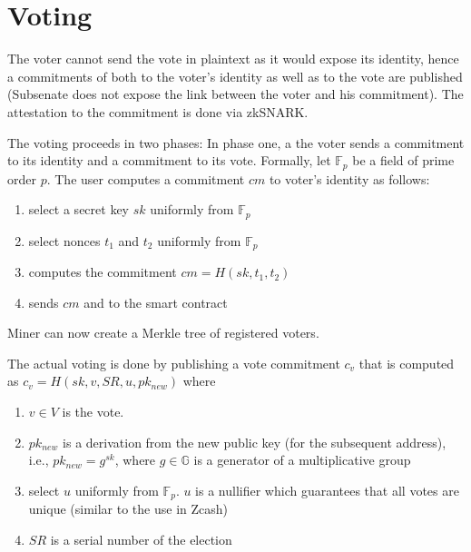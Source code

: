 \documentclass[]{paper}
\begin{document}
	
		
\section{Voting}
The voter cannot send the vote in plaintext as it would expose its identity, hence a commitments of both to the voter's identity as well as to the vote are published (Subsenate does not expose the link between the voter and his commitment). The attestation to the commitment is done via zkSNARK.   

The voting proceeds in two phases: In phase one, a the voter sends a commitment to its identity and a commitment to its vote.  Formally, let $\mathbb{F}_p$ be a field of prime order $p$. The user computes a commitment $cm$ to voter's identity as follows:

\begin{enumerate}
	\item select a secret key $sk$ uniformly from $\mathbb{F}_p$
	\item select nonces $t_1$ and $t_2$ uniformly from $\mathbb{F}_p$
	\item computes the commitment $cm = H(sk,t_1,t_2)$
	\item sends $cm$ and to the smart contract
\end{enumerate}
Miner can now create a Merkle tree of registered voters.

The actual voting is done by publishing a vote commitment $c_v$ that is computed as  $c_v= H(sk,v,SR,u,pk_{new})$ where
\begin{enumerate}
	\item $v\in V$ is the vote. 
	\item $pk_{new}$ is a derivation from the new public key (for the subsequent address), i.e., $pk_{new} = g^{sk}$, where $g\in \mathbb{G}$ is a generator of a multiplicative group
	\item select $u$ uniformly from  $\mathbb{F}_p$. $u$ is a nullifier which guarantees that all votes are unique (similar to the use in Zcash)
	\item $SR$ is a serial number of the election
\end{enumerate}
\end{document}

